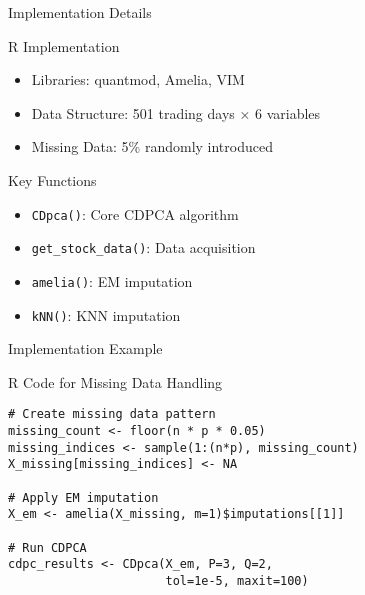 \documentclass{beamer}
\begin{document}
\begin{frame}{Implementation Details}
    \begin{block}{R Implementation}
        \begin{itemize}
            \item Libraries: quantmod, Amelia, VIM
            \item Data Structure: 501 trading days × 6 variables
            \item Missing Data: 5\% randomly introduced
        \end{itemize}
    \end{block}

    \begin{block}{Key Functions}
        \begin{itemize}
            \item \texttt{CDpca()}: Core CDPCA algorithm
            \item \texttt{get\_stock\_data()}: Data acquisition
            \item \texttt{amelia()}: EM imputation
            \item \texttt{kNN()}: KNN imputation
        \end{itemize}
    \end{block}
\end{frame}

\begin{frame}[fragile]{Implementation Example}
    \begin{block}{R Code for Missing Data Handling}
        \begin{verbatim}
# Create missing data pattern
missing_count <- floor(n * p * 0.05)
missing_indices <- sample(1:(n*p), missing_count)
X_missing[missing_indices] <- NA

# Apply EM imputation
X_em <- amelia(X_missing, m=1)$imputations[[1]]

# Run CDPCA
cdpc_results <- CDpca(X_em, P=3, Q=2,
                      tol=1e-5, maxit=100)
        \end{verbatim}
    \end{block}
\end{frame}
\end{document}
